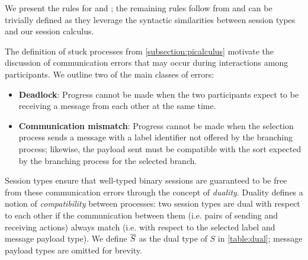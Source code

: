We present the rules for  and ; 
the remaining rules follow from \cite{C406Lecture} 
and can be trivially defined as 
they leverage the syntactic similarities between 
session types and our session calculus.

\begin{prooftree}
\end{prooftree}

\begin{prooftree}
\end{prooftree}

The definition of stuck processes 
from \cref{subsection:picalculus} 
motivate the discussion of communication errors 
that may occur during interactions among participants. 
We outline two of the main classes of errors:

\begin{itemize}
\item \textbf{Deadlock}: 
Progress cannot be made when the two participants 
expect to be receiving a message from each other at the same time.
\item \textbf{Communication mismatch}: 
Progress cannot be made when the selection process 
sends a message with a label identifier not 
offered by the branching process; 
likewise, the payload sent must be compatible 
with the sort expected by the branching process 
for the selected branch.
\end{itemize}

Session types ensure that 
well-typed binary sessions are guaranteed 
to be free from these communication errors 
through the concept of \textit{duality}. 
Duality defines a notion of \textit{compatibility}
 between processes: two session types are dual 
 with respect to each other if the communication 
 between them (i.e. pairs of sending and receiving actions)
 always match (i.e. with respect to the selected label 
 and message payload type). 
We define $\dual{S}$ as the dual type of $S$ in \cref{table:dual};
message payload types are omitted for brevity.

